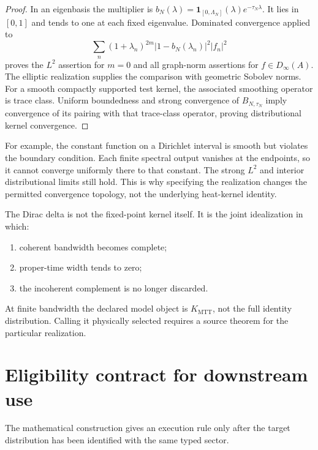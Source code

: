 \documentclass[11pt]{article}
\begin{document}
\begin{proof}
In an eigenbasis the multiplier is
\(b_N(\lambda)=\mathbf1_{[0,\Lambda_N]}(\lambda)e^{-\tau_N\lambda}\).
It lies in \([0,1]\) and tends to one at each fixed eigenvalue. Dominated
convergence applied to
\[
 \sum_n(1+\lambda_n)^{2m}|1-b_N(\lambda_n)|^2|f_n|^2
\]
proves the \(L^2\) assertion for \(m=0\) and all graph-norm assertions for
\(f\in D_\infty(A)\). The elliptic realization supplies the comparison
with geometric Sobolev norms. For a smooth compactly supported test kernel,
the associated smoothing operator is trace class. Uniform boundedness and
strong convergence of \(B_{N,\tau_N}\) imply convergence of its pairing
with that trace-class operator, proving distributional kernel convergence.
\end{proof}

For example, the constant function on a Dirichlet interval is smooth but
violates the boundary condition. Each finite spectral output vanishes at
the endpoints, so it cannot converge uniformly there to that constant.
The strong \(L^2\) and interior distributional limits still hold. This is
why specifying the realization changes the permitted convergence topology,
not the underlying heat-kernel identity.

\begin{corollary}\label{cor:meaning}
The Dirac delta is not the fixed-point kernel itself. It is the joint idealization in which:
\begin{enumerate}[label=(\roman*)]
\item coherent bandwidth becomes complete;
\item proper-time width tends to zero;
\item the incoherent complement is no longer discarded.
\end{enumerate}
At finite bandwidth the declared model object is \(K_{\mathrm{MTT}}\), not
the full identity distribution.  Calling it physically selected requires a
source theorem for the particular realization.
\end{corollary}

\section{Eligibility contract for downstream use}

The mathematical construction gives an execution rule only after the target
distribution has been identified with the same typed sector.
\end{document}
